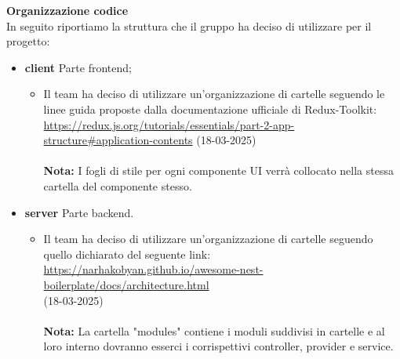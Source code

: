 \noindent \textbf{Organizzazione codice}\\  %
In seguito riportiamo la struttura che il gruppo ha deciso di utilizzare per il progetto:
\begin{itemize}
    \item \textbf{client} Parte frontend;
    \begin{itemize}
        \item Il team ha deciso di utilizzare un'organizzazione di cartelle seguendo le linee guida proposte dalla documentazione ufficiale di Redux-Toolkit:\\
        \url{https://redux.js.org/tutorials/essentials/part-2-app-structure#application-contents} (18-03-2025)\\ \\
        \textbf{Nota:} I fogli di stile per ogni componente UI verrà collocato nella stessa cartella del componente stesso.
    \end{itemize}

    \item \textbf{server} Parte backend.
    \begin{itemize}
        \item Il team ha deciso di utilizzare un'organizzazione di cartelle seguendo quello dichiarato del seguente link:\\
        \url{https://narhakobyan.github.io/awesome-nest-boilerplate/docs/architecture.html}\\ (18-03-2025) \\ \\
        \textbf{Nota:} La cartella "modules" contiene i moduli suddivisi in cartelle e al loro interno dovranno esserci i corrispettivi controller, provider e service.
    \end{itemize}
\end{itemize}
\vspace{1em}

